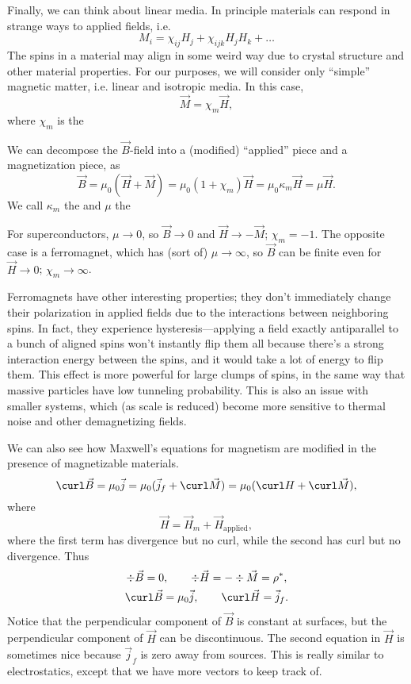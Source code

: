 Finally, we can think about linear media. In principle materials can respond in strange ways to applied fields, i.e.
\begin{equation}
    M_i = \chi_{ij} H_j + \chi_{ijk} H_j H_k+\dots
\end{equation}
The spins in a material may align in some weird way due to crystal structure and other material properties. For our purposes, we will consider only ``simple'' magnetic matter, i.e. linear and isotropic media. In this case,
\begin{equation}
    \vec M = \chi_m \vec H,
\end{equation}
where $\chi_m$ is the 

We can decompose the $\vec B$-field into a (modified) ``applied'' piece and a magnetization piece, as
\begin{equation}
    \vec B = \mu_0(\vec H + \vec M) = \mu_0 (1+\chi_m)\vec H = \mu_0 \kappa_m \vec H = \mu \vec H.
\end{equation}
We call $\kappa_m$ the  and $\mu$ the 

For superconductors, $\mu\to 0$, so $\vec B \to 0$ and $\vec H \to - \vec M$; $\chi_m=-1$. The opposite case is a ferromagnet, which has (sort of) $\mu\to \infty$, so $\vec B$ can be finite even for $\vec H \to 0$; $\chi_m \to \infty$. 

Ferromagnets have other interesting properties; they don't immediately change their polarization in applied fields due to the interactions between neighboring spins. In fact, they experience hysteresis---applying a field exactly antiparallel to a bunch of aligned spins won't instantly flip them all because there's a strong interaction energy between the spins, and it would take a lot of energy to flip them. This effect is more powerful for large clumps of spins, in the same way that massive particles have low tunneling probability. This is also an issue with smaller systems, which (as scale is reduced) become more sensitive to thermal noise and other demagnetizing fields.

We can also see how Maxwell's equations for magnetism are modified in the presence of magnetizable materials.
\begin{equation}
    \curl \vec B = \mu_0 \vec j = \mu_0(\vec j_f + \curl \vec M)=\mu_0(\curl H + \curl \vec M),
\end{equation}
where
\begin{equation}
    \vec H = \vec H_m + \vec H_\text{applied},
\end{equation}
where the first term has divergence but no curl, while the second has curl but no divergence. Thus
\begin{gather}
    \div \vec B = 0, \qquad \div \vec H = - \div \vec M = \rho^*,\\
    \curl \vec B =\mu_0 \vec j, \qquad \curl \vec H = \vec j_f.
\end{gather}
Notice that the perpendicular component of $\vec B$ is constant at surfaces, but the perpendicular component of $\vec H$ can be discontinuous. The second equation in $\vec H$ is sometimes nice because $\vec j_f$ is zero away from sources. This is really similar to electrostatics, except that we have more vectors to keep track of.